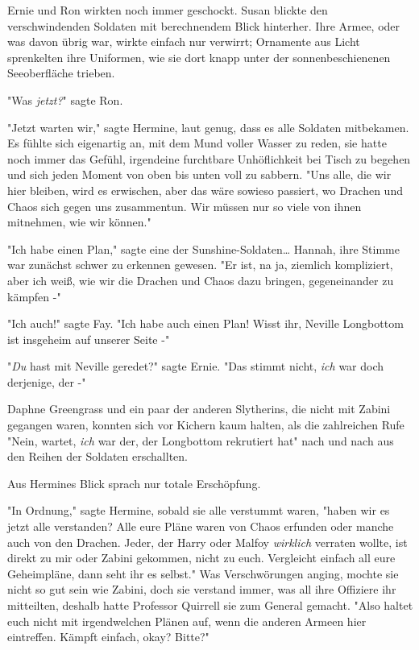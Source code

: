 {Ernie und Ron wirkten noch immer geschockt. Susan blickte den verschwindenden Soldaten mit berechnendem Blick hinterher. Ihre Armee, oder was davon übrig war, wirkte einfach nur verwirrt; Ornamente aus Licht sprenkelten ihre Uniformen, wie sie dort knapp unter der sonnenbeschienenen Seeoberfläche trieben.

"Was \emph{jetzt?}" sagte Ron.

"Jetzt warten wir," sagte Hermine, laut genug, dass es alle Soldaten mitbekamen. Es fühlte sich eigenartig an, mit dem Mund voller Wasser zu reden, sie hatte noch immer das Gefühl, irgendeine furchtbare Unhöflichkeit bei Tisch zu begehen und sich jeden Moment von oben bis unten voll zu sabbern. "Uns alle, die wir hier bleiben, wird es erwischen, aber das wäre sowieso passiert, wo Drachen und Chaos sich gegen uns zusammentun. Wir müssen nur so viele von ihnen mitnehmen, wie wir können."

"Ich habe einen Plan," sagte eine der Sunshine-Soldaten… Hannah, ihre Stimme war zunächst schwer zu erkennen gewesen. "Er ist, na ja, ziemlich kompliziert, aber ich weiß, wie wir die Drachen und Chaos dazu bringen, gegeneinander zu kämpfen -"

"Ich auch!" sagte Fay. "Ich habe auch einen Plan! Wisst ihr, Neville Longbottom ist insgeheim auf unserer Seite -"

"\emph{Du} hast mit Neville geredet?" sagte Ernie. "Das stimmt nicht, \emph{ich} war doch derjenige, der -"

Daphne Greengrass und ein paar der anderen Slytherins, die nicht mit Zabini gegangen waren, konnten sich vor Kichern kaum halten, als die zahlreichen Rufe "Nein, wartet, \emph{ich} war der, der Longbottom rekrutiert hat" nach und nach aus den Reihen der Soldaten erschallten.

Aus Hermines Blick sprach nur totale Erschöpfung.

"In Ordnung," sagte Hermine, sobald sie alle verstummt waren, "haben wir es jetzt alle verstanden? Alle eure Pläne waren von Chaos erfunden oder manche auch von den Drachen. Jeder, der Harry oder Malfoy \emph{wirklich} verraten wollte, ist direkt zu mir oder Zabini gekommen, nicht zu euch. Vergleicht einfach all eure Geheimpläne, dann seht ihr es selbst." Was Verschwörungen anging, mochte sie nicht so gut sein wie Zabini, doch sie verstand immer, was all ihre Offiziere ihr mitteilten, deshalb hatte Professor Quirrell sie zum General gemacht. "Also haltet euch nicht mit irgendwelchen Plänen auf, wenn die anderen Armeen hier eintreffen. Kämpft einfach, okay? Bitte?"

}
